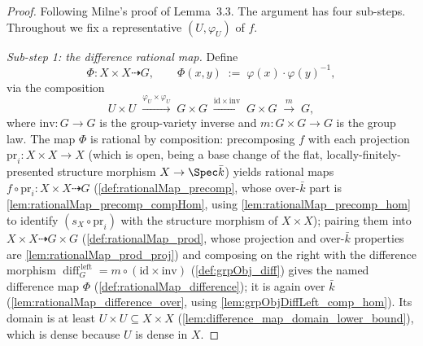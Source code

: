 \begin{proof}
  Following Milne's proof of Lemma~3.3. The argument has four sub-steps. Throughout we
  fix a representative \((U, \varphi_U)\) of \(f\).

  \emph{Sub-step 1: the difference rational map.} Define
  \[
    \Phi \colon X \times X \dashrightarrow G,
    \qquad
    \Phi(x, y) \;:=\; \varphi(x) \cdot \varphi(y)^{-1},
  \]
  via the composition
  \[
    U \times U
    \;\xrightarrow{\varphi_U \times \varphi_U}\; G \times G
    \;\xrightarrow{\mathrm{id} \times \mathrm{inv}}\; G \times G
    \;\xrightarrow{m}\; G,
  \]
  where \(\mathrm{inv} \colon G \to G\) is the group-variety inverse and
  \(m \colon G \times G \to G\) is the group law. The map \(\Phi\) is rational by
  composition: precomposing \(f\) with each projection
  \(\mathrm{pr}_i \colon X \times X \to X\) (which is open, being a base change of the
  flat, locally-finitely-presented structure morphism \(X \to \Spec \bar k\)) yields
  rational maps \(f \circ \mathrm{pr}_i \colon X \times X \dashrightarrow G\)
  (\cref{def:rationalMap_precomp}, whose over-\(\bar k\) part is
  \cref{lem:rationalMap_precomp_compHom}, using \cref{lem:rationalMap_precomp_hom} to
  identify \((s_X \circ \mathrm{pr}_i)\) with the structure morphism of \(X \times X\));
  pairing them into \(X \times X \dashrightarrow
  G \times G\) (\cref{def:rationalMap_prod}, whose projection and over-\(\bar k\) properties
  are \cref{lem:rationalMap_prod_proj}) and composing on the right with the difference
  morphism \(\operatorname{diff}_G^{\,\mathrm{left}} = m \circ (\mathrm{id} \times \mathrm{inv})\)
  (\cref{def:grpObj_diff}) gives the named difference map \(\Phi\)
  (\cref{def:rationalMap_difference}); it is again over \(\bar k\)
  (\cref{lem:rationalMap_difference_over}, using \cref{lem:grpObjDiffLeft_comp_hom}). Its
  domain is at least \(U \times U \subseteq X \times X\)
  (\cref{lem:difference_map_domain_lower_bound}), which is dense because \(U\) is
  dense in \(X\).


\end{proof}
